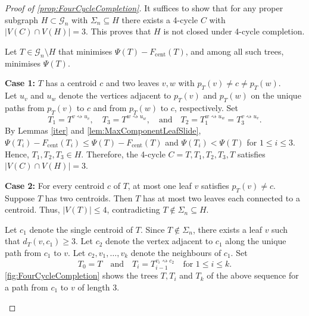\documentclass[reqno,dvipsnames]{amsart}
\theoremstyle{plain}
\numberwithin{equation}{section}
\theoremstyle{definition}
\begin{document}
		\begin{proof} [Proof of \autoref{prop:FourCycleCompletion}]
			It suffices to show that for any proper subgraph $H\subset \mathcal{G}_n$ with $\Sigma_n \subseteq H$ there exists a 4-cycle $C$ with $|V(C) \cap V(H)| = 3$. This proves that $H$ is not closed under 4-cycle completion.

			Let $T\in \mathcal{G}_n\setminus H$ that minimises $\Psi(T) - F_\mathrm{cent}(T)$, and among all such trees, minimises $\Psi(T)$. 

			\textbf{Case 1:} $T$ has a centroid $c$ and two leaves $v,w$ with $p_T(v) \neq c \neq p_T(w)$.\\
			Let $u_v$ and $u_w$ denote the vertices adjacent to $p_T(v)$ and $p_T(w)$ on the unique paths from $p_T(v)$ to $c$ and from $p_T(w)$ to $c$, respectively. Set
			\[
				T_1 = T^{v\rightsquigarrow u_v}, \quad T_3 = T^{w\rightsquigarrow u_w}, \quad \text{and} \quad T_2 = T_1^{w\rightsquigarrow u_w} = T_3^{v\rightsquigarrow u_v}.
			\]
			By Lemmas \ref{iter} and \ref{lem:MaxComponentLeafSlide}, $\Psi(T_i) - F_\mathrm{cent}(T_i) \leq \Psi(T) - F_\mathrm{cent}(T)$ and $\Psi(T_i) < \Psi(T)$ for $1\leq i \leq 3$. Hence, $T_1, T_2, T_3\in H$. Therefore, the 4-cycle $C = T, T_1, T_2, T_3, T$ satisfies $|V(C) \cap V(H)| = 3$.

			\textbf{Case 2:} For every centroid $c$ of $T$, at most one leaf $v$ satisfies $p_T(v) \neq c$.\\
			Suppose $T$ has two centroids. Then $T$ has at most two leaves each connected to a centroid. Thus, $|V(T)| \leq 4$, contradicting $T\notin \Sigma_n\subseteq H$. 
			
			Let $c_1$ denote the single centroid of $T$. Since $T\notin \Sigma_n$, there exists a leaf $v$ such that $d_T(v,c_1) \geq 3$. Let $c_2$ denote the vertex adjacent to $c_1$ along the unique path from $c_1$ to $v$. Let $c_2, v_1,\ldots, v_k$ denote the neighbours of $c_1$. Set
			\[
				T_0 = T \quad \text{and} \quad T_i = T_{i-1}^{v_i\rightsquigarrow c_2} \quad \text{for } 1\leq i\leq k.
			\]
			\autoref{fig:FourCycleCompletion} shows the trees $T, T_i$ and $T_k$ of the above sequence for a path from $c_1$ to $v$ of length 3. 
			\begin{figure}[tbp]
				\centering
				\begin{tikzpicture}[dot/.style={circle, draw, fill, inner sep=0pt, minimum size=4pt}]


\end{tikzpicture}
\end{figure}
\end{proof}
\end{document}
